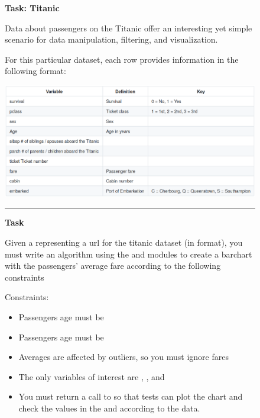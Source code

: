 

\begin{figure}
\begin{mdframed}[backgroundcolor=gray!05] 
\begin{scriptsize}

{\large \textbf{Task: Titanic}} \bigskip


Data about passengers on the Titanic offer an interesting yet simple scenario for data manipulation, filtering, and visualization. \medskip


For this particular dataset, each row provides information in the following format:

\medskip

\includegraphics[width=\textwidth]{appendix/cp6/titanic-table.png}

\medskip




\begin{center}
\rule{10cm}{0.4pt}
\end{center}

\textbf{Task} \medskip

Given a  representing a url for the titanic dataset (in  format), you must write an algorithm using the  and  modules to create a barchart with the passengers' average fare according to the following constraints \medskip


Constraints:

\begin{itemize}


    \item Passengers age must be 

    \item  Passengers age must be 

    \item Averages are affected by outliers, so you must ignore fares 

    \item  The only variables of interest are , , and 

    \item You must return a call to  so that tests can plot the chart and check the values in the  and  according to the data.


\end{itemize}

\end{scriptsize}
\end{mdframed}
\end{figure}
  


